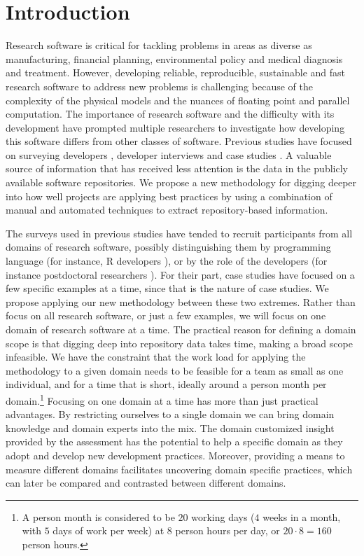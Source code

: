 \documentclass[runningheads]{llncs}
\begin{document}
\section{Introduction} \label{SecIntroduction}

Research software is critical for tackling problems in areas as diverse as
manufacturing, financial planning, environmental policy and medical diagnosis
and treatment.  However, developing reliable, reproducible, sustainable and fast
research software to address new problems is challenging because of the
complexity of the physical models and the nuances of floating point and parallel
computation. The importance of research software and the difficulty with its
development have prompted multiple researchers to investigate how developing
this software differs from other classes of software.  Previous studies have
focused on surveying developers \cite{Carveretc}, developer interviews \cite{}
and case studies \cite{Segal}.  A valuable source of information that has
received less attention is the data in the publicly available software
repositories.  We propose a new methodology for digging deeper into how well
projects are applying best practices by using a combination of manual and
automated techniques to extract repository-based information.

The surveys used in previous studies have tended to recruit participants from
all domains of research software, possibly distinguishing them by programming
language (for instance, R developers \cite{Rstudy}), or by the role of the
developers (for instance postdoctoral researchers \cite{Katz}).  For their part,
case studies have focused on a few specific examples at a time, since that is
the nature of case studies.  We propose applying our new methodology between
these two extremes.  Rather than focus on all research software, or just a few
examples, we will focus on one domain of research software at a time. The
practical reason for defining a domain scope is that digging deep into
repository data takes time, making a broad scope infeasible.  We have the
constraint that the work load for applying the methodology to a given domain
needs to be feasible for a team as small as one individual, and for a time that
is short, ideally around a person month per domain.\footnote{A person month is
considered to be $20$ working days ($4$ weeks in a month, with $5$ days of work
per week) at $8$ person hours per day, or $20 \cdot 8 = 160$ person hours.}
Focusing on one domain at a time has more than just practical advantages.  By
restricting ourselves to a single domain we can bring domain knowledge and
domain experts into the mix.  The domain customized insight provided by the
assessment has the potential to help a specific domain as they adopt and develop
new development practices.  Moreover, providing a means to measure different
domains facilitates uncovering domain specific practices, which can later be
compared and contrasted between different domains.
\end{document}

